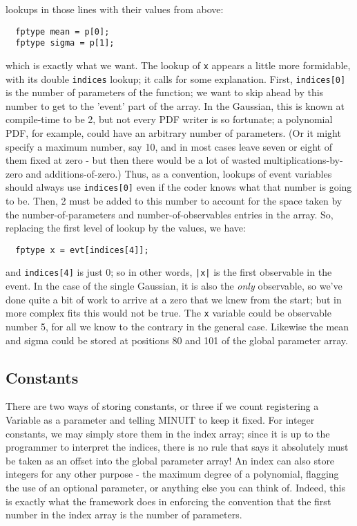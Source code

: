 \documentclass[12pt,pdflatex]{article}
\begin{document}
lookups in those lines with their values from above:
\begin{verbatim}
  fptype mean = p[0];
  fptype sigma = p[1]; 
\end{verbatim}
which is exactly what we want. The lookup of \verb|x| appears a little
more formidable, with its double \verb|indices| lookup; it calls for
some explanation. First, \verb|indices[0]| is the number of parameters
of the function; we want to skip ahead by this number to get to the 'event'
part of the array. In the Gaussian, this is known at compile-time to be
2, but not every PDF writer is so fortunate; a polynomial PDF, for example,
could have an arbitrary number of parameters. (Or it might specify a maximum
number, say 10, and in most cases leave seven or eight of them fixed at zero - 
but then there would be a lot of wasted multiplications-by-zero and additions-of-zero.) 
Thus, as a convention, lookups of event variables should always use 
\verb|indices[0]| even if the coder knows what that number is going to be.
Then, 2 must be added to this number to account for the space taken
by the number-of-parameters and number-of-observables entries in the array.
So, replacing the first level of lookup by the values, we have:
\begin{verbatim}
  fptype x = evt[indices[4]]; 
\end{verbatim}
and \verb|indices[4]| is just 0; so in other words, \verb.|x|. is the first
observable in the event. In the case of the single Gaussian, it is
also the \emph{only} observable, so we've done quite a bit of work to
arrive at a zero that we knew from the start; but in more complex fits this would not be true. 
The \verb|x| variable could be observable number 5, for all we know
to the contrary in the general case. Likewise the mean and sigma
could be stored at positions 80 and 101 of the global parameter array. 

\subsection{Constants}

There are two ways of storing constants, or three if we count
registering a Variable as a parameter and telling MINUIT to keep
it fixed. For integer constants, we may simply store them in the
index array; since it is up to the programmer to interpret the
indices, there is no rule that says it absolutely must be taken
as an offset into the global parameter array! An index can also
store integers for any other purpose - the maximum degree of a 
polynomial, flagging the use of an optional parameter, or anything
else you can think of. Indeed, this is exactly
what the framework does in enforcing the convention that the first
number in the index array is the number of parameters. 
\end{document}
